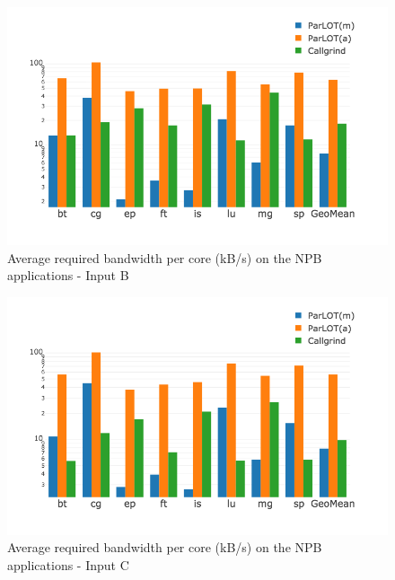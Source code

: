 


\begin{figure}[]
\centering
\includegraphics[width=.75\textwidth]{parlot/figs.comet.newMed/comet_chartAvg_bw_B_p3_5.png}
\caption{  Average required bandwidth per core (kB/s) on the NPB applications - Input B}
\label{comet_chartAvg_bw_B_p3_5}
\end{figure}

\begin{figure}[]
\centering
\includegraphics[width=.75\textwidth]{parlot/figs.comet.newMed/comet_chartAvg_bw_C_p3_5.png}
\caption{ Average required bandwidth per core (kB/s) on the NPB applications - Input C}
\label{comet_chartAvg_bw_C_p3_5}
\end{figure}




